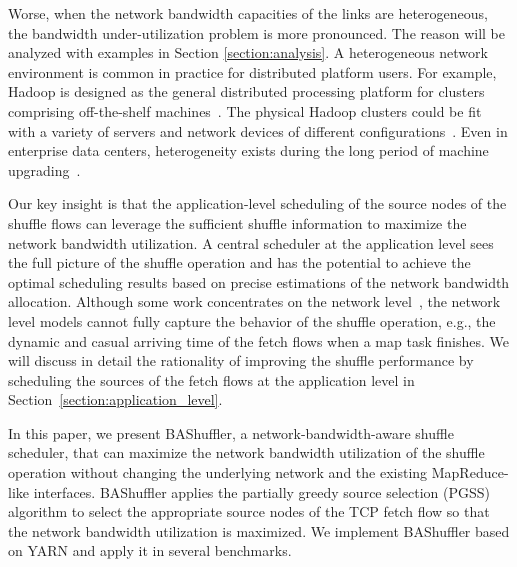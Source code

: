 \documentclass[10pt,journal,compsoc]{IEEEtran}
\begin{document}
Worse, when the network bandwidth capacities of the links are heterogeneous, 
the bandwidth under-utilization problem is more pronounced. 
The reason will be analyzed with examples in Section \ref{section:analysis}.
A heterogeneous network environment is common in practice
for distributed platform users.
For example, Hadoop is designed as the general distributed processing platform for 
clusters comprising off-the-shelf machines~\cite{dean2008mapreduce}. 
The physical Hadoop clusters could be fit with a variety of servers and network devices of different configurations~\cite{zaharia2008improving}. 
Even in enterprise data centers, heterogeneity exists during the long period of machine upgrading~\cite{kant2009data}.

Our key insight is that the application-level scheduling of the source nodes of the shuffle flows can leverage the sufficient shuffle information to maximize the network bandwidth utilization. 
A central scheduler at the application level sees the full picture of the shuffle operation and has the potential to achieve the optimal scheduling results based on precise estimations of the network bandwidth allocation.
Although some work concentrates on the network level~\cite{shieh2011sharing,chowdhury2011managing,chowdhury2014efficient,chowdhury2015efficient}, 
the network level models cannot fully capture the behavior of the shuffle operation, e.g., the dynamic and casual arriving time of the fetch flows
when a map task finishes. 
We will discuss in detail the rationality of improving the shuffle performance by scheduling the sources of the fetch flows at the application level in Section~\ref{section:application_level}.

In this paper, 
we present BAShuffler, a network-bandwidth-aware shuffle scheduler, 
that can maximize the network bandwidth utilization of the shuffle operation
without changing the underlying network and the existing MapReduce-like interfaces. 
BAShuffler applies the partially
greedy source selection (PGSS) algorithm
to select the appropriate source nodes of the TCP fetch flow so that 
the network bandwidth utilization is maximized. 
We implement BAShuffler based on YARN and apply it in
several benchmarks.
\end{document}
